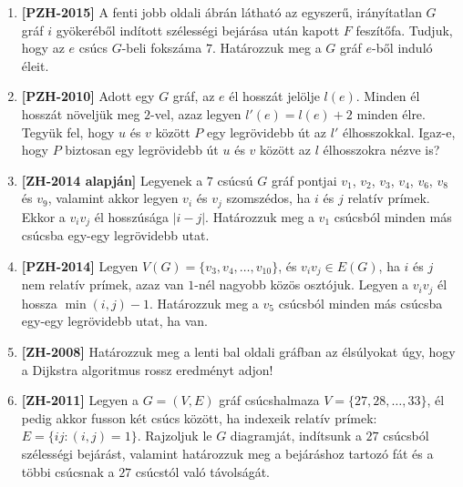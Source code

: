 \documentclass[a4paper,12pt]{article}
\begin{document}
\begin{enumerate}
        \item \textbf{[PZH-2015]} A fenti jobb oldali ábrán látható az egyszerű, irányítatlan $G$ gráf $i$ gyökeréből indított szélességi bejárása után kapott $F$ feszítőfa. Tudjuk, hogy az $e$ csúcs $G$-beli fokszáma $7$. Határozzuk meg a $G$ gráf $e$-ből induló éleit.


        \item \textbf{[PZH-2010]} Adott egy $G$ gráf, az $e$ él hosszát jelölje $l(e)$. Minden él hosszát növeljük meg $2$-vel, azaz legyen $l'(e)=l(e)+2$ minden élre. Tegyük fel, hogy $u$ és $v$ között $P$ egy legrövidebb út az $l'$ élhosszokkal. Igaz-e, hogy $P$ biztosan egy legrövidebb út $u$ és $v$ között az $l$ élhosszokra nézve is?
        
        \item \textbf{[ZH-2014 alapján]} Legyenek a $7$ csúcsú $G$ gráf pontjai $v_1$, $v_2$, $v_3$, $v_4$, $v_6$, $v_8$ és $v_9$, valamint akkor legyen $v_i$ és $v_j$ szomszédos, ha $i$ és $j$ relatív prímek. Ekkor a $v_iv_j$ él hosszúsága $|i-j|$. Határozzuk meg a $v_1$ csúcsból minden más csúcsba egy-egy legrövidebb utat.
        
        \item \textbf{[PZH-2014]} Legyen $V(G) = \{v_3, v_4, \ldots, v_{10}\}$, és $v_iv_j \in E(G)$, ha $i$ és $j$ nem relatív prímek, azaz van $1$-nél nagyobb közös osztójuk. Legyen a $v_iv_j$ él hossza $\min(i,j) - 1$. Határozzuk meg a $v_5$ csúcsból minden más csúcsba egy-egy legrövidebb utat, ha van. 
        
        \item \textbf{[ZH-2008]} Határozzuk meg a lenti bal oldali gráfban az élsúlyokat úgy, hogy a Dijkstra algoritmus rossz eredményt adjon!
        \begin{figure}[h]
            \centering
            \begin{subfigure}{0.4\textwidth}
                \centering
                
            \end{subfigure}
        \end{figure}

        \item \label{feladat:zh2011} \textbf{[ZH-2011]} Legyen a $G=(V, E)$ gráf csúcshalmaza $V = \{27,28,\ldots,33\}$, él pedig akkor fusson két csúcs között, ha indexeik relatív prímek: $E = \{ij:(i,j) = 1\}$. Rajzoljuk le $G$ diagramját, indítsunk a $27$ csúcsból szélességi bejárást, valamint határozzuk meg a bejáráshoz tartozó fát és a többi csúcsnak a $27$ csúcstól való távolságát.


\end{enumerate}
\end{document}
